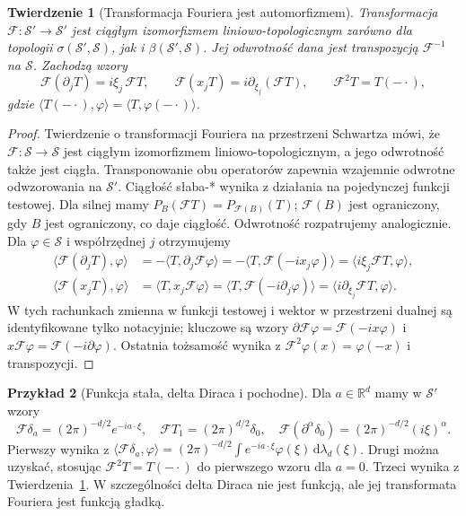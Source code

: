 \documentclass[11pt,a4paper]{article}
\numberwithin{equation}{section}
\theoremstyle{plain}
\newtheorem{twierdzenie}{Twierdzenie}[section]
\theoremstyle{definition}
\newtheorem{przyklad}[twierdzenie]{Przykład}
\theoremstyle{remark}
\newcommand{\R}{\mathbb R}
\begin{document}
\begin{twierdzenie}[Transformacja Fouriera jest automorfizmem]
\label{thm:fourier-auto-tempered22}
Transformacja $\mathcal F:\mathcal S'\to\mathcal S'$
jest ciągłym izomorfizmem liniowo-topologicznym
zarówno dla topologii $\sigma(\mathcal S',\mathcal S)$,
jak i $\beta(\mathcal S',\mathcal S)$.
Jej odwrotność dana jest transpozycją
$\mathcal F^{-1}$ na $\mathcal S$. Zachodzą wzory
\[
\mathcal F(\partial_jT)=i\xi_j\,\mathcal F T,
\qquad
\mathcal F(x_jT)=i\partial_{\xi_j}(\mathcal F T),
\qquad\mathcal F^2T=T(-\cdot),
\]
gdzie $\langle T(-\cdot),\varphi\rangle=
\langle T,\varphi(-\cdot)\rangle$.
\end{twierdzenie}
\begin{proof}
Twierdzenie o transformacji Fouriera na przestrzeni Schwartza mówi, że
$\mathcal F:\mathcal S\to\mathcal S$ jest ciągłym
izomorfizmem liniowo-topologicznym, a jego odwrotność
także jest ciągła. Transponowanie obu operatorów
zapewnia wzajemnie odwrotne odwzorowania na $\mathcal S'$.
Ciągłość słaba-* wynika z działania na pojedynczej
funkcji testowej. Dla silnej mamy
$P_B(\mathcal FT)=P_{\mathcal F(B)}(T)$;
$\mathcal F(B)$ jest ograniczony, gdy $B$ jest ograniczony,
co daje ciągłość. Odwrotność rozpatrujemy analogicznie.
Dla $\varphi\in\mathcal S$ i współrzędnej $j$ otrzymujemy
\[
\begin{aligned}
\langle\mathcal F(\partial_jT),\varphi\rangle
&=-\langle T,\partial_j\mathcal F\varphi\rangle
=-\langle T,\mathcal F(-ix_j\varphi)\rangle
=\langle i\xi_j\mathcal FT,\varphi\rangle,\\
\langle\mathcal F(x_jT),\varphi\rangle
&=\langle T,x_j\mathcal F\varphi\rangle
=\langle T,\mathcal F(-i\partial_j\varphi)\rangle
=\langle i\partial_{\xi_j}\mathcal FT,\varphi\rangle.
\end{aligned}
\]
W tych rachunkach zmienna w funkcji testowej i
wektor w przestrzeni dualnej są identyfikowane
tylko notacyjnie; kluczowe są wzory
$\partial\mathcal F\varphi=\mathcal F(-ix\varphi)$
i $x\mathcal F\varphi=\mathcal F(-i\partial\varphi)$.
Ostatnia tożsamość wynika z
$\mathcal F^2\varphi(x)=\varphi(-x)$ i transpozycji.
\end{proof}

\begin{przyklad}[Funkcja stała, delta Diraca i pochodne]
\label{ex:fourier-delta22}
Dla $a\in\R^d$ mamy w $\mathcal S'$ wzory
\[
\mathcal F\delta_a=(2\pi)^{-d/2}e^{-ia\cdot\xi},
\quad\mathcal F T_1=(2\pi)^{d/2}\delta_0,
\quad\mathcal F(\partial^\alpha\delta_0)
=(2\pi)^{-d/2}(i\xi)^\alpha.
\]
Pierwszy wynika z
$\langle\mathcal F\delta_a,\varphi\rangle
=(2\pi)^{-d/2}\int e^{-ia\cdot\xi}\varphi(\xi)
\,\mathrm d\lambda_d(\xi)$.
Drugi można uzyskać, stosując $\mathcal F^2T=T(-\cdot)$
do pierwszego wzoru dla $a=0$. Trzeci wynika z
Twierdzenia~\ref{thm:fourier-auto-tempered22}.
W szczególności delta Diraca nie jest funkcją,
ale jej transformata Fouriera jest funkcją gładką.
\end{przyklad}
\end{document}
